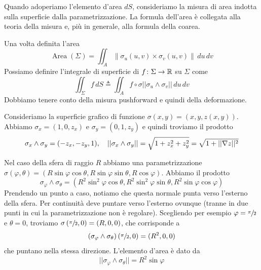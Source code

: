 \documentclass[a4paper]{article}
\begin{document}
\begin{radioactive}
Quando adoperiamo l'elemento d'area \(dS\), consideriamo la misura di area indotta
sulla superficie dalla parametrizzazione.
La formula dell'area è collegata alla teoria della misura e, più in generale, alla formula della coarea.
\end{radioactive}

\begin{radioactive}
Una volta definita l'area
\[
    \operatorname{Area}(\Sigma)
    =
    \iint_A \|\sigma_u(u,v)\times\sigma_v(u,v)\|\, du\,dv
\]
Possiamo definire l'integrale di superficie di \(f \colon \Sigma \to \mathbb{R}\) su \(\Sigma\)
come \[
    \iint_\Sigma f\,dS \triangleq \iint_A f \circ \sigma ||\sigma_u \wedge \sigma_v|| \,du\,dv
\]
Dobbiamo tenere conto della misura pushforward e quindi della deformazione.
\end{radioactive}

\begin{radioactive}
\begin{snippetexample}{}
    Consideriamo la superficie grafico di funzione
    \(\sigma(x,y) = (x,y,z(x,y))\). Abbiamo \(\sigma_x = (1,0,z_x)\)
    e \(\sigma_y = (0,1,z_y)\) e quindi troviamo il prodotto
    \[
        \sigma_x \wedge \sigma_y = (-z_x, -z_y, 1), \quad
        ||\sigma_x \wedge \sigma_y|| = \sqrt{1 + z_x^2 + z_y^2} = \sqrt{1 + ||\nabla z||^2}
    \]
\end{snippetexample}
\end{radioactive}

\begin{radioactive}
\begin{snippetexample}{}
    Nel caso della sfera di raggio \(R\) abbiamo
    una parametrizzazione \(\sigma(\varphi, \theta) = (R\sin\varphi\cos\theta, R \sin\varphi\sin\theta, R\cos\varphi)\).
    Abbiamo il prodotto
    \[
        \sigma_\varphi \wedge \sigma_\theta =
        \left(
            R^2 \sin^2\varphi\cos\theta, R^2 \sin^2\varphi\sin\theta, R^2 \sin\varphi\cos\varphi
        \right)
    \]
    Prendendo un punto a caso, notiamo che questa normale punta verso l'esterno della sfera. Per continuità
    deve puntare verso l'esterno ovunque (tranne in due punti in cui la parametrizzazione non è regolare).
    Scegliendo per esempio \(\varphi = \sfrac\pi2\) e \(\theta = 0\),
    troviamo \(\sigma\left(\sfrac\pi2,0\right) = (R,0,0)\), che corrisponde a
    \[
        (\sigma_\varphi \wedge \sigma_\theta)\left(\sfrac\pi2,0\right)
        = (R^2, 0, 0)
    \]
    che puntano nella stessa direzione.
    L'elemento d'area è dato da
    \[
        ||\sigma_\varphi \wedge \sigma_\theta|| = R^2 \sin\varphi
    \]
\end{snippetexample}
\end{radioactive}
\end{document}
